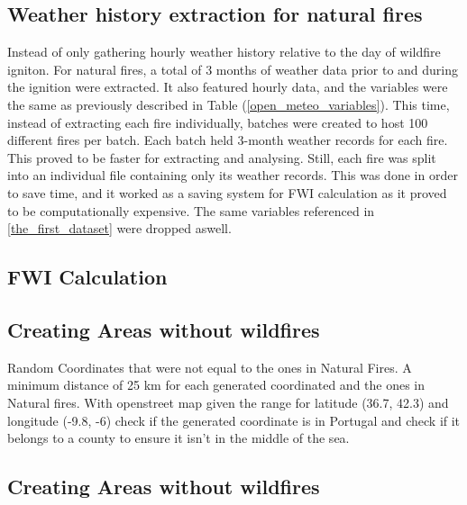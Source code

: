 \subsection{Weather history extraction for natural fires}
Instead of only gathering hourly weather history relative to the day of wildfire igniton. For natural fires, a total of 3 months of weather data prior to and during the ignition were extracted. It also featured hourly data, and the variables were the same as previously described in Table (\ref{open_meteo_variables}).
This time, instead of extracting each fire individually, batches were created to host 100 different fires per batch. Each batch held 3-month weather records for each fire. This proved to be faster for extracting and analysing. Still, each fire was split into an individual file containing only its weather records. This was done in order to save time, and it worked as a saving system for FWI calculation as it proved to be computationally expensive.
The same variables referenced in \ref{the_first_dataset}  were dropped aswell.

\subsection{FWI Calculation}

\cite{IPMA2024}

\cite{van1985equations}

\cite{buckinha2024}

\cite{ipma2015}











\subsection{Creating Areas without wildfires}

Random Coordinates that were not equal to the ones in Natural Fires. A minimum distance of 25 km for each generated coordinated and the ones in Natural fires. With openstreet map given the range for latitude (36.7, 42.3) and longitude (-9.8, -6) check if the generated coordinate is in Portugal and check if it belongs to a county to ensure it isn't in the middle of the sea.








\subsection{Creating Areas without wildfires}

